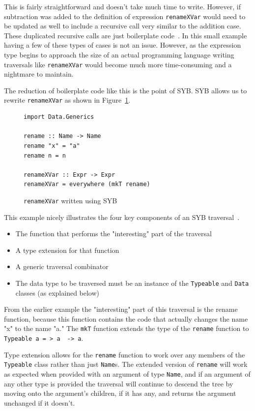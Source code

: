 	This is fairly straightforward and doesn't take much time to write. However, if subtraction was added to the definition of expression \texttt{renameXVar} would need to be updated as well to include a recursive call very similar to the addition case. These duplicated recursive calls are  just boilerplate code~\citep{syb}. In this small example having a few of these types of cases is not an issue. However, as the expression type begins to approach the size of an actual programming language writing traversals like \texttt{renameXVar} would become much more time-consuming and a nightmare to maintain. 
	
	The reduction of boilerplate code like this is the point of SYB. SYB allows us to rewrite \texttt{renameXVar} as shown in Figure~\ref{renameSYB}.
	
	\begin{figure}[t]
	\begin{lstlisting}
import Data.Generics	
	
rename :: Name -> Name
rename "x" = "a"
rename n = n

renameXVar :: Expr -> Expr
renameXVar = everywhere (mkT rename)
\end{lstlisting}
\caption{\texttt{renameXVar} written using SYB}
\label{renameSYB}
\end{figure} 
	
This example nicely illustrates the four key components of an SYB traversal~\citep{syb}.

	\begin{itemize}
		\item The function that performs the "interesting" part of the traversal
		\item A type extension for that function
		\item A generic traversal combinator
		\item The data type to be traversed must be an instance of the \texttt{Typeable} and \texttt{Data} classes (as explained below)
	\end{itemize}
	
	From the earlier example the "interesting" part of this traversal is the rename function, because this function contains the code that actually changes the name "x" to the name "a." The \texttt{mkT} function extends the type of the \texttt{rename} function to \texttt{Typeable~a = > a~ -> a}. 
	
	Type extension allows for the \texttt{rename} function to work over any members of the \texttt{Typeable} class rather than just \texttt{Name}s. The extended version of \texttt{rename} will work as expected when provided with an argument of type \texttt{Name}, and if an argument of any other type is provided the traversal will continue to descend the tree by moving onto the argument's children, if it has any, and returns the argument unchanged if it doesn't.
	
